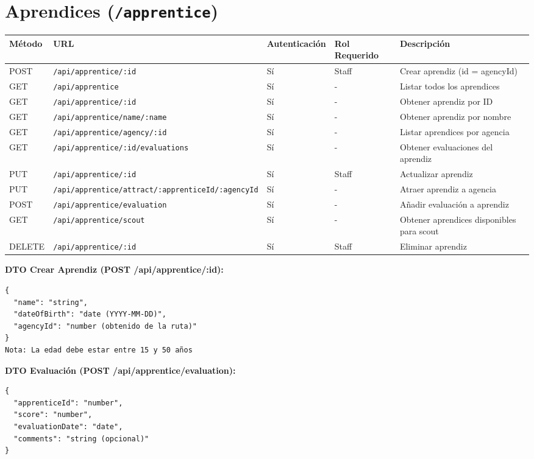 \documentclass[11pt]{article}
\begin{document}
\section{Aprendices (\texttt{/apprentice})}

\begin{longtable}{lllll}
\toprule
\textbf{Método} & \textbf{URL} & \textbf{Autenticación} & \textbf{Rol Requerido} & \textbf{Descripción} \\
\midrule
\endhead
POST & \texttt{/api/apprentice/:id} & Sí & Staff & Crear aprendiz (id = agencyId) \\
GET & \texttt{/api/apprentice} & Sí & - & Listar todos los aprendices \\
GET & \texttt{/api/apprentice/:id} & Sí & - & Obtener aprendiz por ID \\
GET & \texttt{/api/apprentice/name/:name} & Sí & - & Obtener aprendiz por nombre \\
GET & \texttt{/api/apprentice/agency/:id} & Sí & - & Listar aprendices por agencia \\
GET & \texttt{/api/apprentice/:id/evaluations} & Sí & - & Obtener evaluaciones del aprendiz \\
PUT & \texttt{/api/apprentice/:id} & Sí & Staff & Actualizar aprendiz \\
PUT & \texttt{/api/apprentice/attract/:apprenticeId/:agencyId} & Sí & - & Atraer aprendiz a agencia \\
POST & \texttt{/api/apprentice/evaluation} & Sí & - & Añadir evaluación a aprendiz \\
GET & \texttt{/api/apprentice/scout} & Sí & - & Obtener aprendices disponibles para scout \\
DELETE & \texttt{/api/apprentice/:id} & Sí & Staff & Eliminar aprendiz \\
\bottomrule
\end{longtable}

\textbf{DTO Crear Aprendiz (POST /api/apprentice/:id):}
\begin{Verbatim}
{
  "name": "string",
  "dateOfBirth": "date (YYYY-MM-DD)",
  "agencyId": "number (obtenido de la ruta)"
}
Nota: La edad debe estar entre 15 y 50 años
\end{Verbatim}

\textbf{DTO Evaluación (POST /api/apprentice/evaluation):}
\begin{Verbatim}
{
  "apprenticeId": "number",
  "score": "number",
  "evaluationDate": "date",
  "comments": "string (opcional)"
}
\end{Verbatim}
\end{document}

